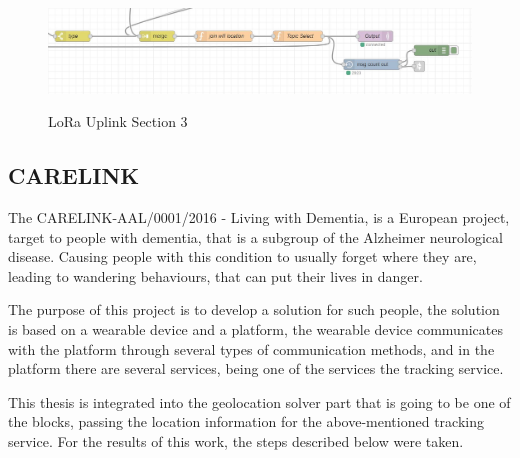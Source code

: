     \begin{figure}[htbp]
      \centering
    
        {\includegraphics[width=\linewidth]{Chapters/Figures/section3.JPG}}
     
      \caption{LoRa Uplink Section 3}
      \label{fig:LoRa_Uplink_Sec3}
    \end{figure}



\subsection{CARELINK} %
\label{sec:Use_case_CARELINK}
The CARELINK-AAL/0001/2016 - Living with Dementia, is a European project, target to people with dementia, that is a subgroup of the Alzheimer neurological disease.
Causing people with this condition to usually forget where they are, leading to wandering behaviours, that can put their lives in danger.

The purpose of this project is to develop a solution for such people, the solution is based on a wearable device and a platform, the wearable device communicates with the platform through several types of communication methods, and in the platform there are several services, being one of the services the tracking service. 

This thesis is integrated into the geolocation solver part that is going to be one of the blocks, passing the location information for the above-mentioned tracking service. For the results of this work, the steps described below were taken.
